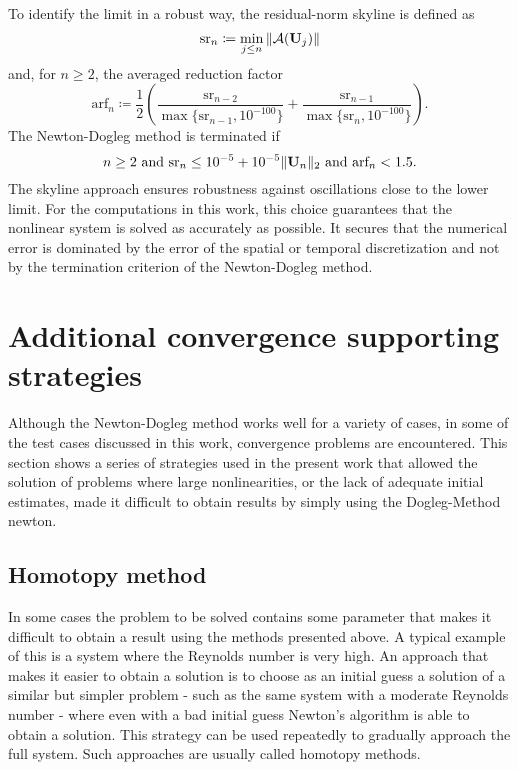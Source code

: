 To identify the limit in a robust way, the residual-norm skyline is defined as
\begin{equation}
	\textrm{sr}_n \coloneqq \min_{j \leq n} \| \mathcal{A}(\textbf{U}_j) \|
\end{equation}
and, for $n \geq 2$, the averaged reduction factor
\begin{equation}
	\textrm{arf}_n \coloneqq \frac{1}{2} \left(
	\frac{ \textrm{sr}_{n-2} }{  \max \{ \textrm{sr}_{n-1}, 10^{-100} \} }
	+  \frac{ \textrm{sr}_{n-1} }{  \max \{ \textrm{sr}_{n},   10^{-100} \} }
	\right) .
\end{equation}
The Newton-Dogleg method is terminated if
\begin{equation}
	n \geq 2 \text{ and }
	\textrm{sr}_n \leq 10^{-5} + 10^{-5} \| \textbf{U}_n \|_2 \text{ and }
	\textrm{arf}_n < 1.5 .
\end{equation}
The skyline approach ensures robustness against oscillations close to the lower limit. For the computations in this work, this choice guarantees that the nonlinear system is solved as accurately as possible. It secures that the numerical error is dominated by the error of the spatial or temporal discretization and not by the termination criterion of the Newton-Dogleg method. 

\section{Additional convergence supporting strategies}\label{sec:ConvSupportStrat}
Although the Newton-Dogleg method works well for a variety of cases, in some of the test cases discussed in this work, convergence problems are encountered. This section shows a series of strategies used in the present work that allowed the solution of problems where large nonlinearities, or the lack of adequate initial estimates, made it difficult to obtain results by simply using the Dogleg-Method newton. 

\subsection{Homotopy method} \label{sec:HomotopyMethod}

In some cases the problem to be solved contains some parameter that makes it difficult to obtain a result using the methods presented above. A typical example of this is a system where the Reynolds number is very high. An approach that makes it easier to obtain a solution is to choose as an initial guess a solution of a similar but simpler problem - such as the same system with a moderate Reynolds number - where even with a bad initial guess Newton's algorithm is able to obtain a solution. This strategy can be used repeatedly to gradually approach the full system. Such approaches are usually called homotopy methods. 

